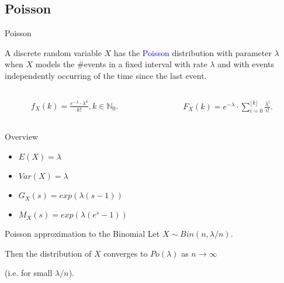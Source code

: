 \documentclass{beamer}
\def\padding{\vspace{0.5cm}}
\def\b{\textcolor{blue}}
\begin{document}
\subsection{Poisson}
\begin{frame}{Poisson}
    \begin{definition}
        A discrete random variable $X$ has the \b{Poisson} distribution with parameter $\lambda$ when $X$ models the \#events in a fixed interval with rate $\lambda$ and with events independently occurring of the time since the last event.
    \end{definition}\pause
    \begin{columns}
        \begin{column}{0.5\textwidth}
           \begin{align*}
                f_X(k) = \frac{e^{- \lambda} \cdot \lambda^k}{k!}, k \in \mathbb{N}_0.
            \end{align*}
        \end{column}\pause
        \begin{column}{0.5\textwidth}
            \begin{align*}
                F_X(k) = e^{- \lambda} \cdot \sum_{i=0}^{\lfloor k \rfloor} \frac{\lambda^i}{i!}.
            \end{align*}
        \end{column}
    \end{columns}\pause\par\padding
    \begin{exampleblock}{Overview}
        \begin{itemize}
            \item $E(X) = \lambda$\pause
            \item $Var(X) = \lambda$\pause
            \item $G_X(s) = exp(\lambda (s - 1))$
            \item $M_X(s) = exp(\lambda (e^s - 1))$
        \end{itemize}
    \end{exampleblock}
\end{frame}

\begin{frame}
    \begin{block}{Poisson approximation to the Binomial}
        Let $X \sim Bin(n, \lambda / n)$.\pause\par
        Then the distribution of $X$ converges to $Po(\lambda)$ as $n \to \infty$\pause\par
        (i.e. for small $\lambda / n$).
    \end{block}
\end{frame}
\end{document}
